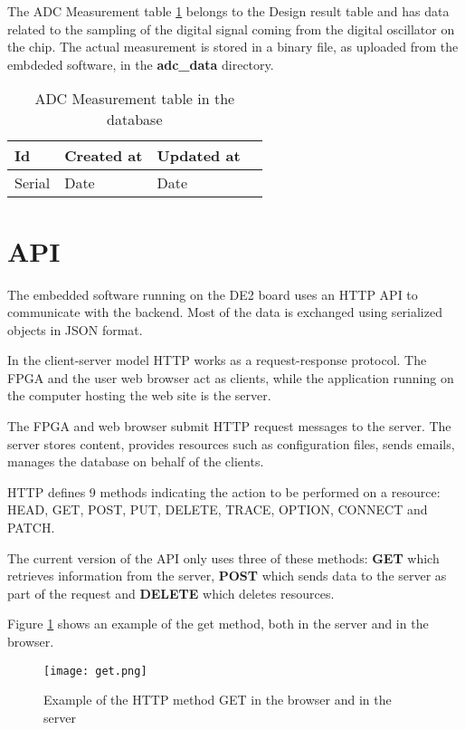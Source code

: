 The ADC Measurement table \ref{tab:ADC_measurement_table} belongs to the Design result table and has data related to the sampling of the digital signal coming from the digital oscillator
on the chip. The actual measurement is stored in a binary file, as uploaded from the embdeded software, in the \textbf{adc\_data} directory.

\begin{table}[h!]
\centering
    \begin{tabular}{| l | l | l | l |}
	\hline
       Id & Created at & Updated at \\ \hline
       Serial & Date & Date\\ \hline
    \end{tabular}
    \caption{ADC Measurement table in the database}
    \label{tab:ADC_measurement_table}
\end{table}


\section{API}
The embedded software running on the DE2 board uses an HTTP API to communicate with
the backend. Most of the data is exchanged using serialized objects in JSON format.

In the client-server model HTTP works as a request-response protocol. The FPGA and the user web browser act as clients, while the application running
on the computer hosting the web site is the server.

The FPGA and web browser submit HTTP request messages to the server. The server stores content, provides resources such as configuration files, sends emails, manages the database on behalf of the clients.

HTTP defines 9 methods indicating the action to be performed on a resource: HEAD, GET, POST, PUT, DELETE, TRACE, OPTION, CONNECT and PATCH.

The current version of the API only uses three of these methods: {\bf GET} which retrieves information from the server,
{\bf POST} which sends data to the server as part of the request and {\bf DELETE} which deletes resources.

Figure \ref{fig:get_example} shows an example of the get method, both in the server and in the browser.

\begin{figure}[htb]
\centering
\texttt{[image: get.png]}
\caption{Example of the HTTP method GET in the browser and in the server}
\label{fig:get_example}
\end{figure}

